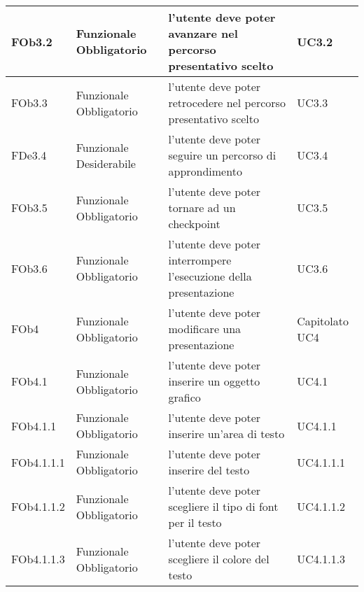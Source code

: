 \begin{longtable}{|l|p{2.5cm}|p{5cm}|p{3.5cm}|}
\hline
FOb3.2 & Funzionale \linebreak Obbligatorio & l'utente deve poter avanzare nel percorso presentativo scelto & UC3.2 \linebreak  \\
\hline
FOb3.3 & Funzionale \linebreak Obbligatorio & l'utente deve poter retrocedere nel percorso presentativo scelto & UC3.3 \linebreak  \\
\hline
FDe3.4 & Funzionale \linebreak Desiderabile & l'utente deve poter seguire un percorso di approndimento & UC3.4 \linebreak  \\
\hline
FOb3.5 & Funzionale \linebreak Obbligatorio & l'utente deve poter tornare ad un checkpoint & UC3.5 \linebreak  \\
\hline
FOb3.6 & Funzionale \linebreak Obbligatorio & l'utente deve poter interrompere l'esecuzione della presentazione & UC3.6 \linebreak  \\
\hline
FOb4 & Funzionale \linebreak Obbligatorio & l'utente deve poter modificare una presentazione & Capitolato \linebreak UC4 \linebreak \\
\hline
FOb4.1 & Funzionale \linebreak Obbligatorio & l'utente deve poter inserire un oggetto grafico & UC4.1 \linebreak  \\
\hline
FOb4.1.1 & Funzionale \linebreak Obbligatorio & l'utente deve poter inserire un'area di testo & UC4.1.1 \linebreak  \\
\hline
FOb4.1.1.1 & Funzionale \linebreak Obbligatorio & l'utente deve poter inserire del testo & UC4.1.1.1 \linebreak  \\
\hline
FOb4.1.1.2 & Funzionale \linebreak Obbligatorio & l'utente deve poter scegliere il tipo di font per il testo & UC4.1.1.2 \linebreak  \\
\hline
FOb4.1.1.3 & Funzionale \linebreak Obbligatorio & l'utente deve poter scegliere il colore del testo & UC4.1.1.3 \linebreak  \\

\end{longtable}
